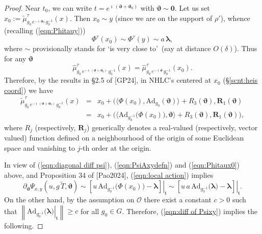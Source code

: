 \documentclass[12pt,a4paper]{article}
\theoremstyle{plain}
\theoremstyle{definition}
\begin{document}
\begin{proof}
Near $t_0$, we can write
$t=e^{\imath\,(\boldsymbol{\vartheta}+\boldsymbol{\vartheta}_0)}$
with $\boldsymbol{\vartheta}\sim \mathbf{0}$.
%
Let us set 
$x_0:=\tilde{\mu}^\tau_{g_0\,e^{-\imath\,\boldsymbol{\vartheta}_0}\,
g_0^{-1}}(x)$. Then $x_0\sim y$ (since we are on the support of
$\rho'$), whence
(recalling (\ref{eqn:Phitauy}))
\begin{equation}
\label{eqn:Phitaux0}
\Phi^\tau(x_0)\sim \Phi^\tau(y)\sim a\,\boldsymbol{\lambda},
\end{equation}
%
where $\sim$ provisionally stands for \lq is very close to\rq\,
(say at distance $O(\delta)$).
Thus for any $\boldsymbol{\vartheta}$
$$
\hat{\mu}^\tau_{
g_0\,
e^{-\imath\,(\boldsymbol{\vartheta}+\boldsymbol{\vartheta}_0)}\,
g_0^{-1}
}(x)=\hat{\mu}^\tau_{
g_0\,
e^{-\imath\,\boldsymbol{\vartheta}}\,
g_0^{-1}
}(x_0).
$$
Therefore, by the results in \S 2.5 of [GP24], in
NHLC's centered at $x_0$ (\S \ref{scnt:heis coord}) we have
\begin{eqnarray}
\label{eqn:local action}
\tilde{\mu}^\tau_{
g_0\,
e^{-\imath\,(\boldsymbol{\vartheta}+\boldsymbol{\vartheta}_0)}\,
g_0^{-1}
}(x)&=&
x_0+\Big(\big\langle \Phi(x_0),\mathrm{Ad}_{g_0}(\boldsymbol{\vartheta})
\big\rangle+R_3(\boldsymbol{\vartheta}),\mathbf{R}_1(\boldsymbol{\vartheta})\\
&=&x_0+\Big(\big\langle \mathrm{Ad}_{g_0^{-1}}\big(\Phi(x_0)\big),\boldsymbol{\vartheta}
\big\rangle+R_3(\boldsymbol{\vartheta}),\mathbf{R}_1(\boldsymbol{\vartheta})
\Big),\nonumber
\end{eqnarray}
where $R_j$ (respectively, $\mathbf{R}_j$) generically denotes 
a real-valued (respectively, vector valued) 
function defined on a neighbourhood of the origin of
some Euclidean space and vanishing to
$j$-th order at the origin.

In view of 
(\ref{eqn:diagonal diff psi}),
(\ref{eqn:PsiAxydefn}) and (\ref{eqn:Phitaux0}) above, and Proposition 34 of [Pao2024], 
(\ref{eqn:local action}) implies
\begin{equation}
\label{eqn:diff of Psixy}
\partial_{\boldsymbol{\vartheta}}\Psi_{x,y}(u,g\,\tilde{T},\boldsymbol{\vartheta})\sim \left.\left[u\,
\mathrm{Ad}_{g_0^{-1}}\big(\Phi(x_0)\big)-\boldsymbol{\lambda}
\right]\right|_\mathfrak{t}
\sim \left.\left[u\,a\,
\mathrm{Ad}_{g_0^{-1}}\big(\boldsymbol{\lambda}\big)-\boldsymbol{\lambda}\right]\right|_\mathfrak{t}.
\end{equation}
On the other hand, by the assumption on $\mathcal{O}$ 
there exist a constant $c>0$ such that
$
 \left\|\left.\mathrm{Ad}_{g_0^{-1}}\big(\boldsymbol{\lambda}\big)\right|_\mathfrak{t}
\right\|\ge c
$
for all $g_0\in G$. 
Therefore, (\ref{eqn:diff of Psixy}) implies the following.


\end{proof}
\end{document}
